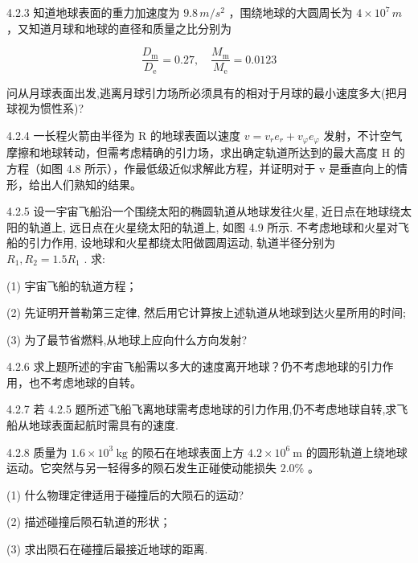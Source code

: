 \begin{problem}{4.2.3}
知道地球表面的重力加速度为 $9.8 \, m/s^{2}$ ，围绕地球的大圆周长为 $4 \times 10^{7} \, m$ ，又知道月球和地球的直径和质量之比分别为

\[
\frac {D _ {\mathrm{m}}}{D _ {\mathrm{e}}} = 0. 2 7, \quad \frac {M _ {\mathrm{m}}}{M _ {\mathrm{e}}} = 0. 0 1 2 3
\]

问从月球表面出发,逃离月球引力场所必须具有的相对于月球的最小速度多大(把月球视为惯性系)?
\end{problem}
\clearpage


\begin{problem}{4.2.4}
一长程火箭由半径为 R 的地球表面以速度 $v = v_{r} e_{r} + v_{\varphi} e_{\varphi}$ 发射，不计空气摩擦和地球转动，但需考虑精确的引力场，求出确定轨道所达到的最大高度 H 的方程（如图 4.8 所示），作最低级近似求解此方程，并证明对于 v 是垂直向上的情形，给出人们熟知的结果。
\begin{center}

\end{center}
\end{problem}
\clearpage


\begin{problem}{4.2.5}
设一宇宙飞船沿一个围绕太阳的椭圆轨道从地球发往火星, 近日点在地球绕太阳的轨道上, 远日点在火星绕太阳的轨道上, 如图 4.9 所示. 不考虑地球和火星对飞船的引力作用, 设地球和火星都绕太阳做圆周运动, 轨道半径分别为 $R_{1}, R_{2} = 1.5R_{1}$ . 求:

(1) 宇宙飞船的轨道方程；

(2) 先证明开普勒第三定律, 然后用它计算按上述轨道从地球到达火星所用的时间;

(3) 为了最节省燃料,从地球上应向什么方向发射?
\begin{center}

\end{center}
\end{problem}
\clearpage


\begin{problem}{4.2.6}
求上题所述的宇宙飞船需以多大的速度离开地球？仍不考虑地球的引力作用，也不考虑地球的自转。
\end{problem}
\clearpage


\begin{problem}{4.2.7}
若 4.2.5 题所述飞船飞离地球需考虑地球的引力作用,仍不考虑地球自转,求飞船从地球表面起航时需具有的速度.
\end{problem}
\clearpage


\begin{problem}{4.2.8}
质量为 $1.6 \times 10^{3} \mathrm{~kg}$ 的陨石在地球表面上方 $4.2 \times 10^{6} \mathrm{~m}$ 的圆形轨道上绕地球运动。它突然与另一轻得多的陨石发生正碰使动能损失 $2.0\%$ 。

(1) 什么物理定律适用于碰撞后的大陨石的运动?

(2) 描述碰撞后陨石轨道的形状；

(3) 求出陨石在碰撞后最接近地球的距离.
\end{problem}
\clearpage


